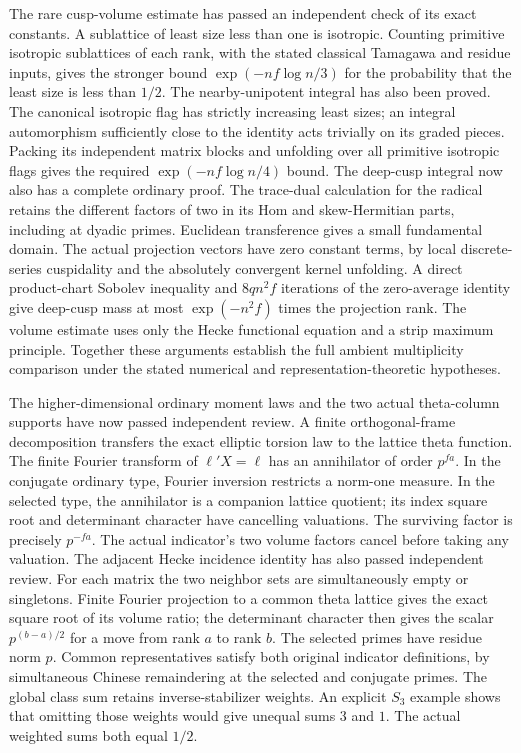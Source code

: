\documentclass[11pt,a4paper]{article}
\theoremstyle{remark}
\begin{document}
The rare cusp-volume estimate has passed an independent check of
its exact constants. A sublattice of least size less than one is
isotropic. Counting primitive isotropic sublattices of each rank,
with the stated classical Tamagawa and residue inputs, gives
the stronger bound $\exp(-nf\log n/3)$ for the probability that
the least size is less than $1/2$\cite{weil-siegel,louboutin-residue}.
The nearby-unipotent integral has also been proved. The canonical
isotropic flag has strictly increasing least sizes; an integral
automorphism sufficiently close to the identity acts trivially on
its graded pieces. Packing its independent matrix blocks and unfolding
over all primitive isotropic flags gives the required
$\exp(-nf\log n/4)$ bound. The deep-cusp integral now also has a
complete ordinary proof. The trace-dual calculation for the radical
retains the different factors of two in its Hom and skew-Hermitian
parts, including at dyadic primes. Euclidean transference gives a
small fundamental domain\cite{banaszczyk-transference,bost-kunnemann-extensions}.
The actual projection vectors have zero constant terms, by local
discrete-series cuspidality and the absolutely convergent kernel
unfolding\cite{khare-larsen-savin}. A direct product-chart Sobolev
inequality and $8qn^2f$ iterations of the zero-average identity give
deep-cusp mass at most $\exp(-n^2f)$ times the projection rank.
The volume estimate uses only the Hecke functional equation and a
strip maximum principle\cite{zaman-hecke-estimates}. Together these
arguments establish the full ambient multiplicity comparison under
the stated numerical and representation-theoretic hypotheses.

The higher-dimensional ordinary moment laws and the two actual
theta-column supports have now passed independent review. A finite
orthogonal-frame decomposition transfers the exact elliptic torsion
law to the lattice theta function. The finite Fourier transform of
$\ell'X=\ell$ has an annihilator of order $p^{fa}$. In the conjugate
ordinary type, Fourier inversion restricts a norm-one measure. In the
selected type, the annihilator is a companion lattice quotient; its
index square root and determinant character have cancelling valuations.
The surviving factor is precisely $p^{-fa}$. The actual indicator's
two volume factors cancel before taking any valuation. The adjacent
Hecke incidence identity has also passed independent review. For each
matrix the two neighbor sets are simultaneously empty or singletons.
Finite Fourier projection to a common theta lattice gives the exact
square root of its volume ratio; the determinant character then gives
the scalar $p^{(b-a)/2}$ for a move from rank $a$ to rank $b$.
The selected primes have residue norm $p$. Common representatives
satisfy both original indicator definitions, by simultaneous Chinese
remaindering at the selected and conjugate primes. The global class
sum retains inverse-stabilizer weights. An explicit $S_3$ example
shows that omitting those weights would give unequal sums $3$ and $1$.
The actual weighted sums both equal $1/2$.
\end{document}

